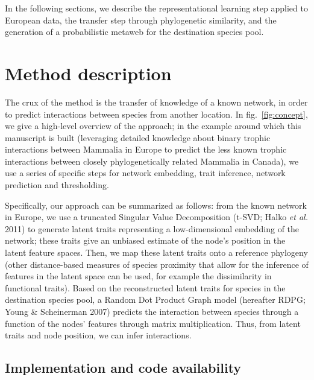 \documentclass[11pt]{article}
\begin{document}
In the following sections, we describe the representational learning
step applied to European data, the transfer step through phylogenetic
similarity, and the generation of a probabilistic metaweb for the
destination species pool.

\hypertarget{method-description}{%
\section{Method description}\label{method-description}}

The crux of the method is the transfer of knowledge of a known network,
in order to predict interactions between species from another location.
In fig.~\ref{fig:concept}, we give a high-level overview of the
approach; in the example around which this manuscript is built
(leveraging detailed knowledge about binary trophic interactions between
Mammalia in Europe to predict the less known trophic interactions
between closely phylogenetically related Mammalia in Canada), we use a
series of specific steps for network embedding, trait inference, network
prediction and thresholding.

Specifically, our approach can be summarized as follows: from the known
network in Europe, we use a truncated Singular Value Decomposition
(t-SVD; Halko \emph{et al.} 2011) to generate latent traits representing
a low-dimensional embedding of the network; these traits give an
unbiased estimate of the node's position in the latent feature spaces.
Then, we map these latent traits onto a reference phylogeny (other
distance-based measures of species proximity that allow for the
inference of features in the latent space can be used, for example the
dissimilarity in functional traits). Based on the reconstructed latent
traits for species in the destination species pool, a Random Dot Product
Graph model (hereafter RDPG; Young \& Scheinerman 2007) predicts the
interaction between species through a function of the nodes' features
through matrix multiplication. Thus, from latent traits and node
position, we can infer interactions.

\hypertarget{implementation-and-code-availability}{%
\subsection{Implementation and code
availability}\label{implementation-and-code-availability}}
\end{document}
